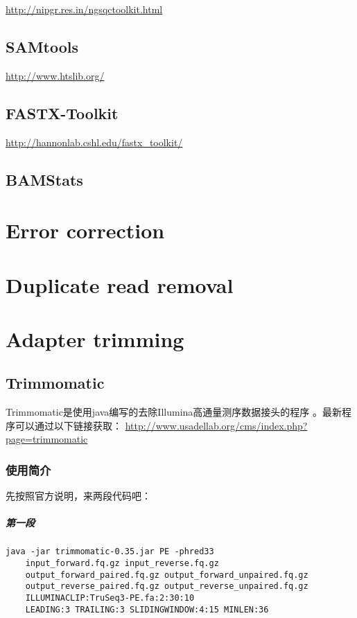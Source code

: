 \url{http://nipgr.res.in/ngsqctoolkit.html}

\subsection{SAMtools}

\url{http://www.htslib.org/}

\subsection{FASTX-Toolkit}

\url{http://hannonlab.cshl.edu/fastx_toolkit/}

\subsection{BAMStats}





\section{Error correction}


\section{Duplicate read removal}


\section{Adapter trimming}

\subsection{Trimmomatic}
Trimmomatic是使用java编写的去除Illumina高通量测序数据接头的程序 \cite{Trimmomatic2014bioinformatics}。最新程序可以通过以下链接获取：
\url{http://www.usadellab.org/cms/index.php?page=trimmomatic}

\subsubsection{使用简介}

先按照官方说明，来两段代码吧：

\subparagraph{第一段}

\begin{verbatim}
java -jar trimmomatic-0.35.jar PE -phred33 
    input_forward.fq.gz input_reverse.fq.gz 
    output_forward_paired.fq.gz output_forward_unpaired.fq.gz 
    output_reverse_paired.fq.gz output_reverse_unpaired.fq.gz 
    ILLUMINACLIP:TruSeq3-PE.fa:2:30:10 
    LEADING:3 TRAILING:3 SLIDINGWINDOW:4:15 MINLEN:36
\end{verbatim}


